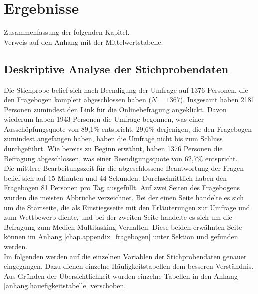 %
%
\let\raggedsection\centering 
\chapter{Ergebnisse}
\let\raggedsection\raggedright 
\glsresetall
Zusammenfassung der folgenden Kapitel.\\
Verweis auf den Anhang mit der Mittelwertstabelle.
\section{Deskriptive Analyse der Stichprobendaten}
\label{label.stichprobe}
Die Stichprobe belief sich nach Beendigung der Umfrage auf 1376 Personen, die den Fragebogen komplett abgeschlossen haben ($N = 1367$). Insgesamt haben 2181 Personen zumindest den Link für die Onlinebefragung angeklickt. Davon wiederum haben 1943 Personen die Umfrage begonnen, was einer Ausschöpfungsquote von 89,1\% entspricht. 29,6\% derjenigen, die den Fragebogen zumindest angefangen haben, haben die Umfrage nicht bis zum Schluss durchgeführt. Wie bereits zu Beginn erwähnt, haben 1376 Personen die Befragung abgeschlossen, was einer Beendigungsquote von 62,7\% entspricht.\\
Die mittlere Bearbeitungszeit für die abgeschlossene Beantwortung der Fragen belief sich auf 15 Minuten und 44 Sekunden. Durchschnittlich haben den Fragebogen 81 Personen pro Tag ausgefüllt. Auf zwei Seiten des Fragebogens wurden die meisten Abbrüche verzeichnet. Bei der einen Seite handelte es sich um die Startseite, die als Einstiegsseite mit den Erläuterungen zur Umfrage und zum Wettbewerb diente, und bei der zweiten Seite handelte es sich um die Befragung zum Medien-Multitasking-Verhalten. Diese beiden erwähnten Seite können im Anhang \ref{chap.appendix_fragebogen} unter Sektion  und  gefunden werden.\\
Im folgenden werden auf die einzelnen Variablen der Stichprobendaten genauer eingegangen. Dazu dienen einzelne Häufigkeitstabellen dem besseren Verständnis. Aus Gründen der Übersichtlichkeit wurden einzelne Tabellen in den Anhang \ref{anhang.hauefigkeitstabelle} verschoben.
